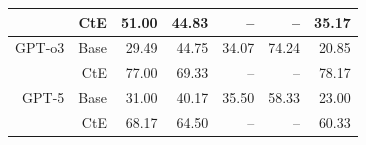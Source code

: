 \begin{table}[!t]
\begin{tabular}{r r !{\color{white!80!black} \vline} r r r r r}
& CtE & \textcolor{blue!60!black}{51.00} & \textcolor{blue!60!black}{44.83} & \textcolor{blue!60!black}{--} & \textcolor{blue!60!black}{--} & \textcolor{blue!60!black}{35.17} \\ \midrule
\sf GPT-o3  & Base & \textcolor{blue!60!black}{29.49} & \textcolor{blue!60!black}{44.75} & \textcolor{blue!60!black}{34.07} & \textcolor{blue!60!black}{74.24} & \textcolor{blue!60!black}{20.85} \\
& CtE & \textcolor{blue!60!black}{77.00} & \textcolor{blue!60!black}{69.33} & \textcolor{blue!60!black}{--} & \textcolor{blue!60!black}{--} & \textcolor{blue!60!black}{78.17} \\ \midrule
\sf GPT-5  & Base & \textcolor{blue!60!black}{31.00} & \textcolor{blue!60!black}{40.17} & \textcolor{blue!60!black}{35.50} & \textcolor{blue!60!black}{58.33} & \textcolor{blue!60!black}{23.00} \\
& CtE & \textcolor{blue!60!black}{68.17} & \textcolor{blue!60!black}{64.50} & \textcolor{blue!60!black}{--} & \textcolor{blue!60!black}{--} & \textcolor{blue!60!black}{60.33} \\ 
\bottomrule
\end{tabular}
\label{tab:cRi_by_id_act}
\end{table}
